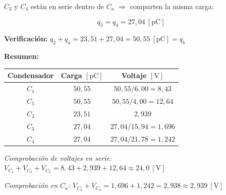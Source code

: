 \documentclass[12pt,letterpaper]{article}
\begin{document}
$C_3$ y $C_4$ est\'an en serie dentro de $C_a$ $\Rightarrow$ comparten la misma carga:

\[
    \boxed{q_3 = q_4 = 27{,}04\ [\text{pC}]}
\]

\noindent\textbf{Verificaci\'on:} $q_2 + q_a = 23{,}51 + 27{,}04 = 50{,}55\ [\text{pC}] = q_b$ \checkmark

\noindent\textbf{Resumen:}

\begin{center}
\begin{tabular}{ccc}
\hline
Condensador & Carga $[\text{pC}]$ & Voltaje $[\text{V}]$ \\
\hline
$C_1$ & $50{,}55$ & $50{,}55/6{,}00 = 8{,}43$ \\
$C_5$ & $50{,}55$ & $50{,}55/4{,}00 = 12{,}64$ \\
$C_2$ & $23{,}51$ & $2{,}939$ \\
$C_3$ & $27{,}04$ & $27{,}04/15{,}94 = 1{,}696$ \\
$C_4$ & $27{,}04$ & $27{,}04/21{,}78 = 1{,}242$ \\
\hline
\end{tabular}
\end{center}

\noindent\small\textit{Comprobaci\'on de voltajes en serie:} $V_{C_1} + V_{C_b} + V_{C_5} = 8{,}43 + 2{,}939 + 12{,}64 \approx 24{,}0\ [\text{V}]$ \checkmark

\noindent\textit{Comprobaci\'on en $C_a$:} $V_{C_3} + V_{C_4} = 1{,}696 + 1{,}242 = 2{,}938 \approx 2{,}939\ [\text{V}]$ \checkmark
\normalsize
\end{document}
